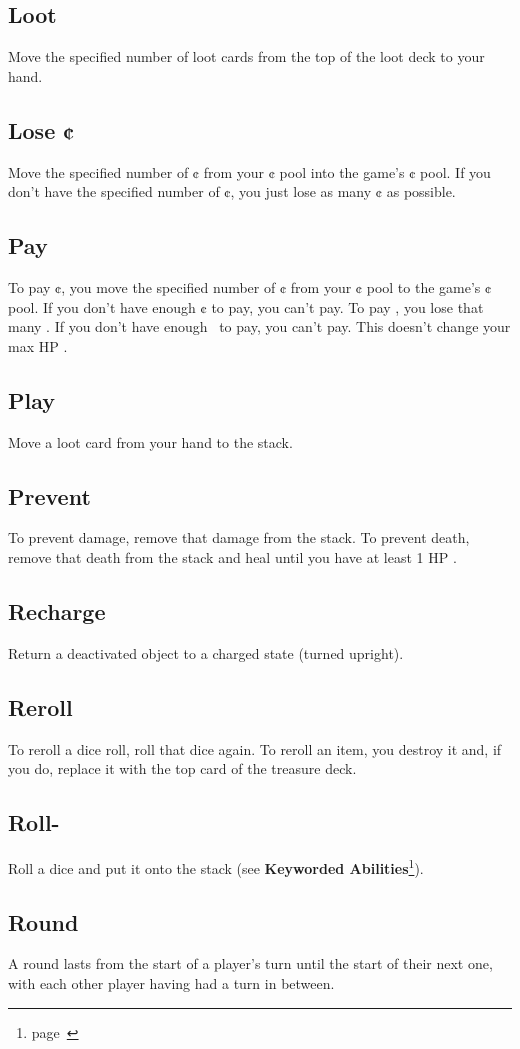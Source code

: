 \documentclass[
  fontsize=10pt,
  paper=a5,
  version=last,
  chapterprefix=true,
  bindingoffset=5mm,
  ]{scrbook}
\newcommand*{\inlineicon}[1]{%
    \raisebox{-.3\baselineskip}{%
        \smash{%
            \texttt{[image: \#1]}%
        }%
    }%
}
\newcommand{\heart}{\inlineicon{./assets/ms-heart.png}}
\begin{document}
    \subsection*{Loot}
    Move the specified number of loot cards from the top of the loot deck to your hand.
    \subsection*{Lose ¢}
    Move the specified number of ¢ from your ¢ pool into the game’s ¢ pool. If you don’t have the specified number of ¢, you just lose as many ¢ as possible.
    \subsection*{Pay}
    To pay ¢, you move the specified number of ¢ from your ¢ pool to the game’s ¢ pool. If you don’t have enough ¢ to pay, you can’t pay. To pay \heart, you lose that many \heart. If you don’t have enough \heart\ to pay, you can’t pay. This doesn’t change your max HP\heart.
    \subsection*{Play}
    Move a loot card from your hand to the stack.
    \subsection*{Prevent}
    To prevent damage, remove that damage from the stack. To prevent death, remove that death from the stack and heal until you have at least 1 HP\heart.
    \subsection*{Recharge}
    Return a deactivated object to a charged state (turned upright).
    \subsection*{Reroll}
    To reroll a dice roll, roll that dice again. To reroll an item, you destroy it and, if you do, replace it with the top card of the treasure deck.
    \subsection*{Roll-}
    Roll a dice and put it onto the stack (see \textbf{Keyworded Abilities}\footnote{page~\pageref{keyworded}}).
    \subsection*{Round}
    A round lasts from the start of a player’s turn until the start of their next one, with each other player having had a turn in between.
\end{document}
